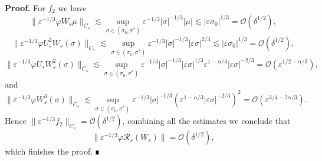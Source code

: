 \documentclass[letterpaper,11pt]{article}
\newcommand{\Ral}{\mathcal{R}}
\newcommand{\rmO}{\mathcal{O}}
\newcommand{\eps}{\varepsilon}
\newcommand{\lar}{ \lesssim }
\numberwithin{equation}{section}
\theoremstyle{plain}
\newenvironment{Proof}[1][.]%
 {\begin{trivlist}\item[]\textbf{Proof#1 }}%
 {\hspace*{\fill}$\rule{0.3\baselineskip}{0.35\baselineskip}$\end{trivlist}}
\begin{document}
\begin{Proof}
For $f_2$ we have
\[
\|\eps^{-1/3}\varphi W_s\mu\|_{C_s} \lar \sup_{\sigma \in (\sigma_0, \sigma^{*})} \eps^{-1/3}|\sigma|^{-1/3}|\mu| \lar |\eps \sigma_0|^{1/3} = \rmO(\delta^{1/2}),
\]
\[
\|\eps^{-1/3}\varphi U_s^2W_s(\sigma) \|_{C_s}  \lar \sup_{\sigma \in (\sigma_0, \sigma^{*})}\eps^{-1/3}|\sigma|^{-1/3} |\eps \sigma|^{2/3} \lar |\eps \sigma_0|^{1/3}= \rmO(\delta^{1/2}),
\]
\[
\|\eps^{-1/3}\varphi U_sW_s^2(\sigma) \|_{C_s}  \lar \sup_{\sigma \in (\sigma_0, \sigma^{*})}\eps^{-1/3}|\sigma|^{-1/3} |\eps \sigma|^{1/3}\eps^{1-\alpha/3}|\eps\sigma|^{-2/3} = \rmO(\eps^{1/2-\alpha/3}),
\]
and
\[
\|\eps^{-1/3}\varphi W_s^3(\sigma) \|_{C_s}  \lar \sup_{\sigma \in (\sigma_0, \sigma^{*})}\eps^{-1/3}|\sigma|^{-1/3} (\eps^{1-\alpha/3}|\eps\sigma|^{-2/3})^2 = \rmO(\eps^{3/4-2\alpha/3}).
\]
Hence $\|\eps^{-1/3}f_2\|_{C_s} = \rmO(\delta^{1/2})$, combining all the estimates we conclude that 
\[
\|\eps^{-1/3}\varphi \Ral_s(W_s) \| = \rmO(\delta^{1/2}),
\]
which finishes the proof.
\end{Proof}
\end{document}
